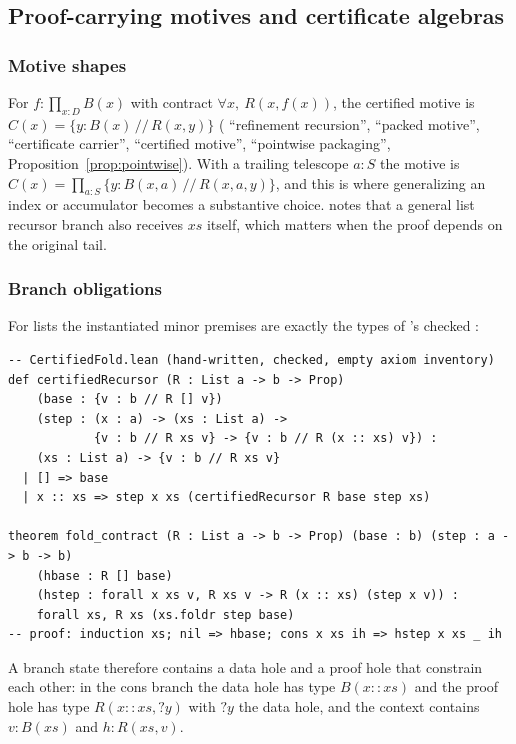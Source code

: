 \subsection{Proof-carrying motives and certificate algebras}\label{alg:rec-certified}

\subsubsection{Motive shapes}

For $f : \prod_{x:D} B(x)$ with contract $\forall x,\ R(x, f(x))$, the certified motive is $C(x) = \{y : B(x) \,//\, R(x,y)\}$ ( ``refinement recursion'',  ``packed motive'',  ``certificate carrier'',  ``certified motive'',  ``pointwise packaging'', Proposition~\ref{prop:pointwise}). With a trailing telescope $a : S$ the motive is $C(x) = \prod_{a:S}\{y : B(x,a) \,//\, R(x,a,y)\}$, and this is where generalizing an index or accumulator becomes a substantive choice.  notes that a general list recursor branch also receives $xs$ itself, which matters when the proof depends on the original tail.

\subsubsection{Branch obligations}

For lists the instantiated minor premises are exactly the types of 's checked :
\begin{lstlisting}
-- CertifiedFold.lean (hand-written, checked, empty axiom inventory)
def certifiedRecursor (R : List a -> b -> Prop)
    (base : {v : b // R [] v})
    (step : (x : a) -> (xs : List a) ->
            {v : b // R xs v} -> {v : b // R (x :: xs) v}) :
    (xs : List a) -> {v : b // R xs v}
  | [] => base
  | x :: xs => step x xs (certifiedRecursor R base step xs)

theorem fold_contract (R : List a -> b -> Prop) (base : b) (step : a -> b -> b)
    (hbase : R [] base)
    (hstep : forall x xs v, R xs v -> R (x :: xs) (step x v)) :
    forall xs, R xs (xs.foldr step base)
-- proof: induction xs; nil => hbase; cons x xs ih => hstep x xs _ ih
\end{lstlisting}
A branch state therefore contains a data hole and a proof hole that constrain each other: in the cons branch the data hole has type $B(x{::}xs)$ and the proof hole has type $R(x{::}xs, ?y)$ with $?y$ the data hole, and the context contains $v : B(xs)$ and $h : R(xs, v)$.

